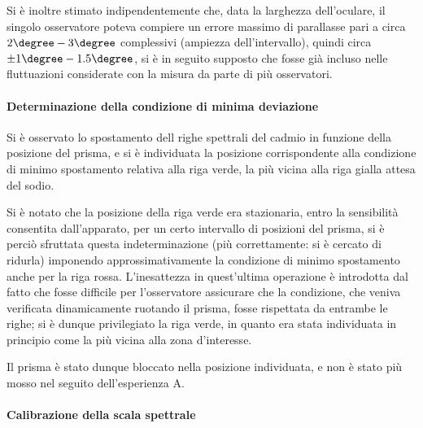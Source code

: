 \documentclass[a4paper,10pt]{article}
\begin{document}
Si è inoltre stimato indipendentemente che, data la larghezza dell'oculare, il singolo osservatore poteva compiere un errore massimo di parallasse pari a circa $2\degree-3\degree$ complessivi (ampiezza dell'intervallo), quindi circa $\pm 1\degree-1.5\degree$, si è in seguito supposto che fosse già incluso nelle fluttuazioni considerate con la misura da parte di più osservatori.

\paragraph{Determinazione della condizione di minima deviazione} Si è osservato lo spostamento dell righe spettrali del cadmio in funzione della posizione del prisma, e si è individuata la posizione corrispondente alla condizione di minimo spostamento relativa alla riga verde, la più vicina alla riga gialla attesa del sodio.

Si è notato che la posizione della riga verde era stazionaria, entro la sensibilità consentita dall'apparato, per un certo intervallo di posizioni del prisma, si è perciò sfruttata questa indeterminazione (più correttamente: si è cercato di ridurla) imponendo approssimativamente la condizione di minimo spostamento anche per la riga rossa.
L'inesattezza in quest'ultima operazione è introdotta dal fatto che fosse difficile per l'osservatore assicurare che la condizione, che veniva verificata dinamicamente ruotando il prisma, fosse rispettata da entrambe le righe; si è dunque privilegiato la riga verde, in quanto era stata individuata in principio come la più vicina alla zona d'interesse.

Il prisma è stato dunque bloccato nella posizione individuata, e non è stato più mosso nel seguito dell'esperienza A.

\paragraph{Calibrazione della scala spettrale} 
\end{document}
